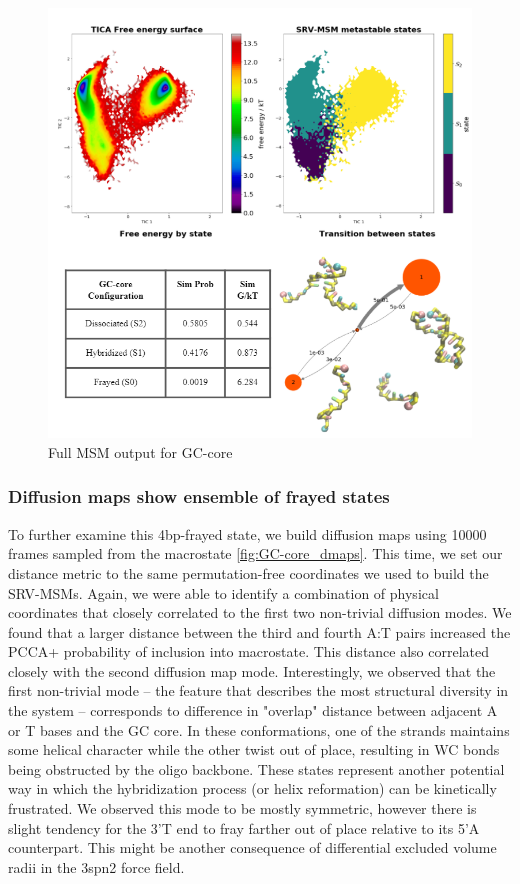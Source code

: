 \documentclass[journal=jpcbfk,manuscript=article]{achemso}
\begin{document}
\begin{figure}[ht!]
	\begin{center}
        \includegraphics[width=\textwidth]{Figs/figs_0804/GC-core_thermo.PNG}
        \caption{Full MSM output for GC-core}
        \label{fig:GC-core_thermo}
	\end{center}
\end{figure}

\subsubsection{Diffusion maps show ensemble of frayed states}

To further examine this 4bp-frayed state, we build diffusion maps using 10000 frames sampled from the macrostate \ref{fig:GC-core_dmaps}. This time, we set our distance metric to the same permutation-free coordinates we used to build the SRV-MSMs. Again, we were able to identify a combination of physical coordinates that closely correlated to the first two non-trivial diffusion modes. We found that a larger distance between the third and fourth A:T pairs increased the PCCA+ probability of inclusion into macrostate. This distance also correlated closely with the second diffusion map mode. Interestingly, we observed that the first non-trivial mode -- the feature that describes the most structural diversity in the system -- corresponds to difference in "overlap" distance between adjacent A or T bases and the GC core. In these conformations, one of the strands maintains some helical character while the other twist out of place, resulting in WC bonds being obstructed by the oligo backbone. These states represent another potential way in which the hybridization process (or helix reformation) can be kinetically frustrated. We observed this mode to be mostly symmetric, however there is slight tendency for the 3'T end to fray farther out of place relative to its 5'A counterpart. This might be another consequence of differential excluded volume radii in the 3spn2 force field.
\end{document}
